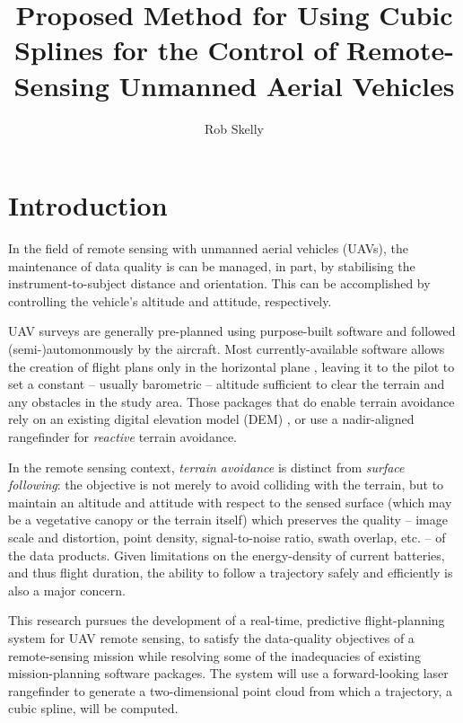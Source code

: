 \documentclass[doc]{apa6}
\title{Proposed Method for Using Cubic Splines for the Control of Remote-Sensing Unmanned Aerial Vehicles}
\author{Rob Skelly}
\affiliation{University of Victoria}
\begin{document}
\maketitle



\section{Introduction}

In the field of remote sensing with unmanned aerial vehicles (UAVs), the maintenance of data quality is can be managed, in part, by stabilising the instrument-to-subject distance and orientation. This can be accomplished by controlling the vehicle's altitude and attitude, respectively.

UAV surveys are generally pre-planned using purpose-built software and followed (semi-)automonmously by the aircraft. Most currently-available software allows the creation of flight plans only in the horizontal plane \parencite[e.g.,][]{ArduPilot2018,DJI2018a,Microdrones2018,Group2018,UAVToolbox2018}, leaving it to the pilot to set a constant -- usually barometric -- altitude sufficient to clear the terrain and any obstacles in the study area. Those packages that do enable terrain avoidance rely on an  existing digital elevation model (DEM) \parencite[e.g.,][]{PrecisionHawk2018,UgCS2018,MapsMadeEasy2018}, or use a nadir-aligned rangefinder for \emph{reactive} terrain avoidance.

In the remote sensing context, \emph{terrain avoidance} is distinct from \emph{surface following}: the objective is not merely to avoid colliding with the terrain, but to maintain an altitude and attitude with respect to the sensed surface (which may be a vegetative canopy or the terrain itself) which preserves the quality -- image scale and distortion, point density, signal-to-noise ratio, swath overlap, etc. -- of the data products. Given limitations on the energy-density of current batteries, and thus flight duration, the ability to follow a trajectory safely and efficiently is also a major concern.

This research pursues the development of a real-time, predictive flight-planning system for UAV remote sensing, to satisfy the data-quality objectives of a remote-sensing mission while resolving some of the inadequacies of existing mission-planning software packages. The system will use a forward-looking laser rangefinder to generate a two-dimensional point cloud from which a trajectory, a cubic spline, will be computed.
\end{document}
